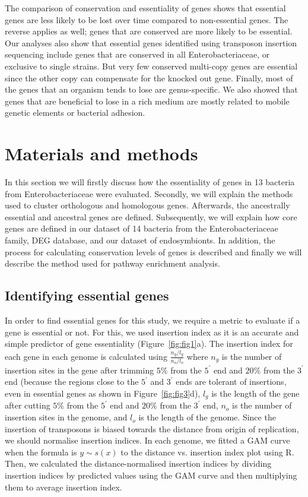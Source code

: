 \documentclass[12pt,letterpaper]{article}
\begin{document}
The comparison of conservation and essentiality of genes shows that essential genes are less likely to be lost over time compared to non-essential genes. The reverse applies as well; genes that are conserved are more likely to be essential. Our analyses also show that essential genes identified using transposon insertion sequencing include genes that are conserved in all Enterobacteriaceae, or exclusive to single strains. But very few conserved multi-copy genes are essential since the other copy can compensate for the knocked out gene. Finally, most of the genes that an organism tends to lose are genus-specific. We also showed that genes that are beneficial to lose in a rich medium are mostly related to mobile genetic elements or bacterial adhesion.

\section{Materials and methods}
In this section we will firstly discuss how the essentiality of genes in 13 bacteria from Enterobacteriaceae were evaluated. Secondly, we will explain the methods used to cluster orthologous and homologous genes. Afterwards, the ancestrally essential and ancestral genes are defined. Subsequently, we will explain how core genes are defined in our dataset of 14 bacteria from the Enterobacteriaceae family, DEG database, and our dataset of endosymbionts. In addition, the process for calculating conservation levels of genes is described and finally we will describe the method used for pathway enrichment analysis.

\subsection{Identifying essential genes}\label{meth:essentiality}
In order to find essential genes for this study, we require a metric to evaluate if a gene is essential or not. For this, we used insertion index as it is an accurate and simple predictor of gene essentiality (Figure~\ref{fig:fig1}a). The insertion index for each gene in each genome is calculated using $\frac{n_g/l_g}{n_o/l_o}$ where $n_g$ is the number of insertion sites in the gene after trimming $5\%$ from the $5^\prime$ end and $20\%$ from the $3^\prime$ end (because the regions close to the $5^\prime$ and $3^\prime$ ends are tolerant of insertions, even in essential genes as shown in Figure~\ref{fig:fig3}d), $l_g$ is the length of the gene after cutting $5\%$ from the $5^\prime$ end and $20\%$ from the $3^\prime$ end, $n_o$ is the number of insertion sites in the genome, and $l_o$ is the length of the genome. Since the insertion of transposons is biased towards the distance from origin of replication, we should normalise insertion indices. In each genome, we fitted a GAM curve when the formula is $y \sim s(x)$ to the distance vs. insertion index plot using R. Then, we calculated the distance-normalised insertion indices by dividing insertion indices by predicted values using the GAM curve and then multiplying them to average insertion index.
\end{document}
